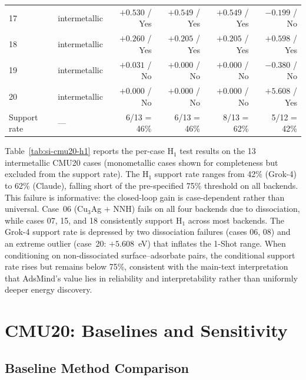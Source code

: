 \documentclass[%
 preprint,
 superscriptaddress,
 amsmath,amssymb,
 aps,
 prb,
 floatfix,
]{revtex4-2}
\begin{document}
\begin{table}[ht]
\begin{tabular}{llrrrr}
17 & intermetallic & $+0.530$ / Yes & $+0.549$ / Yes & $+0.549$ / Yes & $-0.199$ / No \\
18 & intermetallic & $+0.260$ / Yes & $+0.205$ / Yes & $+0.205$ / Yes & $+0.598$ / Yes \\
19 & intermetallic & $+0.031$ / No & $+0.000$ / No & $+0.000$ / No & $-0.380$ / No \\
20 & intermetallic & $+0.000$ / No & $+0.000$ / No & $+0.000$ / No & $+5.608$ / Yes \\
\midrule
Support rate & --- & 6/13 = 46\% & 6/13 = 46\% & 8/13 = 62\% & 5/12 = 42\% \\
\bottomrule
\end{tabular}
\end{table}

Table~\ref{tab:si-cmu20-h1} reports the per-case H$_1$ test results on the 13 intermetallic CMU20 cases (monometallic cases shown for completeness but excluded from the support rate). The H$_1$ support rate ranges from 42\% (Grok-4) to 62\% (Claude), falling short of the pre-specified 75\% threshold on all backends. This failure is informative: the closed-loop gain is case-dependent rather than universal. Case~06 (Cu$_3$Ag + NNH) fails on all four backends due to dissociation, while cases 07, 15, and 18 consistently support H$_1$ across most backends. The Grok-4 support rate is depressed by two dissociation failures (cases 06, 08) and an extreme outlier (case~20: $+5.608$~eV) that inflates the 1-Shot range. When conditioning on non-dissociated surface--adsorbate pairs, the conditional support rate rises but remains below 75\%, consistent with the main-text interpretation that AdsMind's value lies in reliability and interpretability rather than uniformly deeper energy discovery.



\section{CMU20: Baselines and Sensitivity}

\subsection{Baseline Method Comparison}
\end{document}
